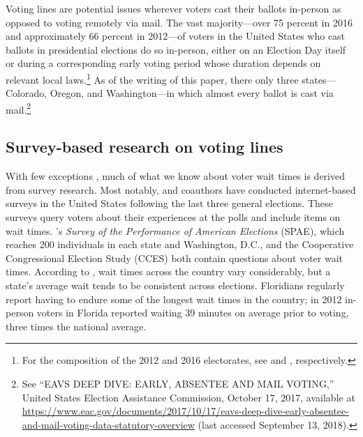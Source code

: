 \documentclass[12pt,titlepage]{article}
\begin{document}
Voting lines are potential issues wherever voters cast their ballots
in-person as opposed to voting remotely via mail.  The vast
majority---over 75 percent in 2016 and approximately 66 percent in
2012---of voters in the United States who cast ballots in presidential
elections do so in-person, either on an Election Day itself or during
a corresponding early voting period whose duration depends on relevant
local laws.\footnote{For the composition of the 2012 and 2016
  electorates, see \citet{eac:2012} and \citet{eac:2016},
  respectively.}  As of the writing of this paper, there only three
states---Colorado, Oregon, and Washington---in which almost every
ballot is cast via mail.\footnote{See ``EAVS DEEP DIVE: EARLY,
  ABSENTEE AND MAIL VOTING,'' United States Election Assistance
  Commission, October 17, 2017, available at
  \url{https://www.eac.gov/documents/2017/10/17/eavs-deep-dive-early-absentee-and-mail-voting-data-statutory-overview}
  (last accessed September 13, 2018).}


\subsection*{Survey-based research on voting lines}


With few exceptions \citep[e.g.,][]{spencermarkovits:renege,
  herronsmith:hanoverstudy, pettigrew:longlinesminorityprecincts},
much of what we know about voter wait times is derived from survey
research. Most notably, \citet{stewart:waitingtovote2012} and
coauthors have conducted internet-based surveys in the United States
following the last three general elections. These surveys query voters
about their experiences at the polls and include items on wait times.
\citeauthor{stewart:waitingtovote2012}'s \emph{Survey of the
  Performance of American Elections} (SPAE), which reaches 200
individuals in each state and Washington, D.C., and the Cooperative
Congressional Election Study (CCES) both contain questions about voter
wait times. According to \citeauthor{stewart:waitingtovote2012}, wait
times across the country vary considerably, but a state's average wait
tends to be consistent across elections. Floridians regularly report
having to endure some of the longest wait times in the country; in
2012 in-person voters in Florida reported waiting 39 minutes on
average prior to voting, three times the national average.
\end{document}
